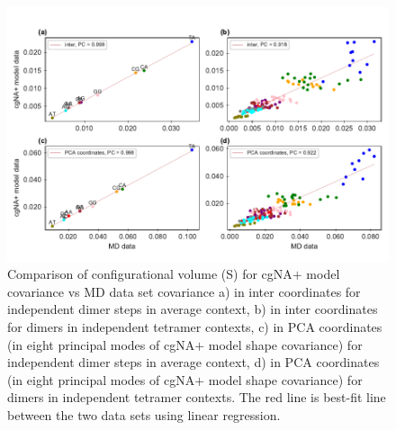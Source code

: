 \begin{figure}[H]
	\begin{center}
	\includegraphics[scale=1]{./Xray_images/vol_R2_CG-MD.pdf}
	\caption{Comparison of configurational volume (S)
	for cgNA$+$ model covariance vs MD data set covariance a) in inter coordinates for independent dimer steps in average context, b) in inter coordinates for dimers in independent tetramer contexts, c) in PCA coordinates (in  eight principal modes of cgNA$+$ model shape covariance) for independent dimer steps in average context, d) in PCA coordinates (in  eight principal modes of cgNA$+$ model shape covariance) for dimers in independent tetramer contexts.
	The red line is best-fit line between the two data sets using linear regression.}
\label{SIfig:MDstiff}
\end{center}
\end{figure}



